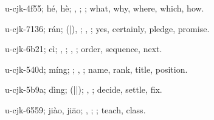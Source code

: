 \begin{multicols}{2}
{\cjkgGlue{}u-cjk-4f55; hé, hè; \cjkgGlue{}, \cjkgGlue{}; \cjkgGlue{}; what, why, where, which, how.

\cjkgGlue{}u-cjk-7136; rán; \cjkgGlue{}\cjkgGlue{}(\cjkgGlue{}|\cjkgGlue{}), \cjkgGlue{}; \cjkgGlue{}, \cjkgGlue{}; yes, certainly, pledge, promise.

\cjkgGlue{}u-cjk-6b21; cì; \cjkgGlue{}\cjkgGlue{}\cjkgGlue{}, \cjkgGlue{}; \cjkgGlue{}, \cjkgGlue{}; order, sequence, next.

\cjkgGlue{}u-cjk-540d; míng; \cjkgGlue{}; \cjkgGlue{}, \cjkgGlue{}; name, rank, title, position.

\cjkgGlue{}u-cjk-5b9a; dìng; \cjkgGlue{}\cjkgGlue{}(\cjkgGlue{}|\cjkgGlue{}|\cjkgGlue{}); \cjkgGlue{}, \cjkgGlue{}; decide, settle, fix.

\cjkgGlue{}u-cjk-6559; jiào, jiāo; \cjkgGlue{}\cjkgGlue{}\cjkgGlue{}, \cjkgGlue{}\cjkgGlue{}\cjkgGlue{}; \cjkgGlue{}; teach, class.

}
\end{multicols}
